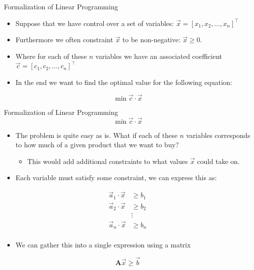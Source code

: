 \documentclass[
	11pt, %
]{beamer}
\begin{document}
\begin{frame}[label={sec:org7e6dba1}]{Formalization of Linear Programming}
\begin{itemize}
\item Suppose that we have control over a set of variables: \(\vec{x} = [x_1, x_2, \ldots, x_n]^\top\)
\pause
\item Furthermore we often constraint \(\vec{x}\) to be non-negative: \(\vec{x} \geq 0\).
\end{itemize}
\pause
\begin{itemize}
\item Where for each of these \(n\) variables we have an associated coefficient \(\vec{c} = [c_1, c_2, \ldots, c_n]^\top\)
\end{itemize}
\pause
\begin{itemize}
\item In the end we want to find the optimal value for the following equation:
\end{itemize}
\[
\min \vec{c} \cdot \vec{x}
\]
\end{frame}
\begin{frame}[label={sec:orgc3775a6}]{Formalization of Linear Programming}
\vspace{-1em}
\[ \min \vec{c} \cdot \vec{x} \]
\vspace{-1em}
\begin{itemize}
\item The problem is quite easy as is. What if each of these \(n\) variables
corresponds to how much of a given product that we want to buy?
\begin{itemize}
\item This would add additional constraints to what values \(\vec{x}\) could
take on.
\end{itemize}
\end{itemize}
\pause
\begin{itemize}
\item Each variable must satisfy some constraint, we can express this as:
\end{itemize}
\vspace{-2em}
\begin{align*}
\vec{a}_1 \cdot \vec{x} &\geq b_1 \\
\vec{a}_2 \cdot \vec{x} &\geq b_2 \\
& \vdots  \\
\vec{a}_n \cdot \vec{x} &\geq b_n \\
\end{align*}
\vspace{-3.5em}
\pause
\begin{itemize}
\item We can gather this into a single expression using a matrix
\end{itemize}
\[
\mathbf{A} \vec{x} \geq \vec{b}
\]
\pause
\vspace{-2em}
\end{frame}
\end{document}
